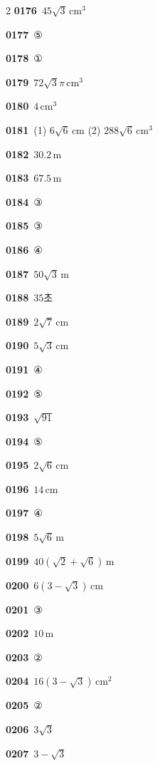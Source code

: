 \documentclass[10pt,a4paper]{article}
\begin{document}
\begin{multicols}{2}
\noindent\textbf{0176}\ $45\sqrt{3}\,\mathrm{cm}^3$\par
\noindent\textbf{0177}\ ⑤\par
\noindent\textbf{0178}\ ①\par
\noindent\textbf{0179}\ $72\sqrt{3}\pi\,\mathrm{cm}^3$\par
\noindent\textbf{0180}\ $4\,\mathrm{cm}^3$\par
\noindent\textbf{0181}\ (1) $6\sqrt{6}\,\mathrm{cm}$ (2) $288\sqrt{6}\,\mathrm{cm}^3$\par
\noindent\textbf{0182}\ $30.2\,\mathrm{m}$\par
\noindent\textbf{0183}\ $67.5\,\mathrm{m}$\par
\noindent\textbf{0184}\ ③\par
\noindent\textbf{0185}\ ③\par
\noindent\textbf{0186}\ ④\par
\noindent\textbf{0187}\ $50\sqrt{3}\,\mathrm{m}$\par
\noindent\textbf{0188}\ $35$초\par
\noindent\textbf{0189}\ $2\sqrt{7}\,\mathrm{cm}$\par
\noindent\textbf{0190}\ $5\sqrt{3}\,\mathrm{cm}$\par
\noindent\textbf{0191}\ ④\par
\noindent\textbf{0192}\ ⑤\par
\noindent\textbf{0193}\ $\sqrt{91}$\par
\noindent\textbf{0194}\ ⑤\par
\noindent\textbf{0195}\ $2\sqrt{6}\,\mathrm{cm}$\par
\noindent\textbf{0196}\ $14\,\mathrm{cm}$\par
\noindent\textbf{0197}\ ④\par
\noindent\textbf{0198}\ $5\sqrt{6}\,\mathrm{m}$\par
\noindent\textbf{0199}\ $40(\sqrt{2}+\sqrt{6})\,\mathrm{m}$\par
\noindent\textbf{0200}\ $6(3-\sqrt{3})\,\mathrm{cm}$\par
\noindent\textbf{0201}\ ③\par
\noindent\textbf{0202}\ $10\,\mathrm{m}$\par
\noindent\textbf{0203}\ ②\par
\noindent\textbf{0204}\ $16(3-\sqrt{3})\,\mathrm{cm}^2$\par
\noindent\textbf{0205}\ ②\par
\noindent\textbf{0206}\ $3\sqrt{3}$\par
\noindent\textbf{0207}\ $3-\sqrt{3}$\par

\end{multicols}
\end{document}
